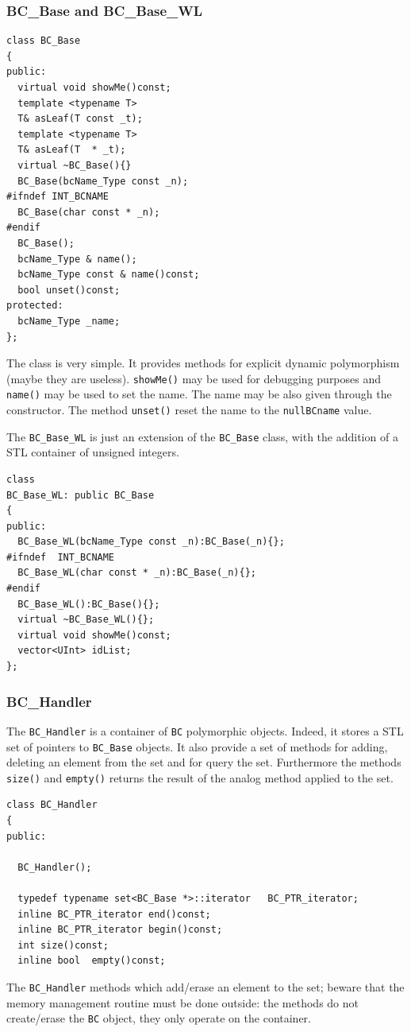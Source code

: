 \subsubsection{BC\_Base and BC\_Base\_WL}
\begin{verbatim}
class BC_Base
{
public:
  virtual void showMe()const;
  template <typename T>
  T& asLeaf(T const _t);
  template <typename T>
  T& asLeaf(T  * _t);
  virtual ~BC_Base(){}
  BC_Base(bcName_Type const _n);
#ifndef INT_BCNAME
  BC_Base(char const * _n);
#endif
  BC_Base();
  bcName_Type & name();
  bcName_Type const & name()const;
  bool unset()const;
protected:
  bcName_Type _name;
};
\end{verbatim}
The class is very simple. It provides methods for explicit dynamic
polymorphism (maybe they are useless). \texttt{showMe()} may be used
for debugging purposes and \texttt{name()} may be used to set the
name. The name may be also given through the constructor. The method
\texttt{unset()} reset the name to the \texttt{nullBCname} value.

The \texttt{BC\_Base\_WL} is just an extension of the
\texttt{BC\_Base} class, with the addition of a STL container of
unsigned integers.
\begin{verbatim}
class
BC_Base_WL: public BC_Base
{
public:
  BC_Base_WL(bcName_Type const _n):BC_Base(_n){};
#ifndef  INT_BCNAME
  BC_Base_WL(char const * _n):BC_Base(_n){};
#endif
  BC_Base_WL():BC_Base(){};
  virtual ~BC_Base_WL(){};
  virtual void showMe()const;
  vector<UInt> idList;
};
\end{verbatim}
\subsubsection{BC\_Handler}
The \texttt{BC\_Handler} is a container of \texttt{BC} polymorphic
objects.  Indeed, it stores a STL set of pointers to \texttt{BC\_Base}
objects. It also provide a set of methods for adding, deleting an
element from the set and for query the set. Furthermore the methods
\texttt{size()} and \texttt{empty()} returns the result of the analog
method applied to the set.

\begin{verbatim}
class BC_Handler
{
public:

  BC_Handler();
  
  typedef typename set<BC_Base *>::iterator   BC_PTR_iterator;
  inline BC_PTR_iterator end()const;
  inline BC_PTR_iterator begin()const;
  int size()const;
  inline bool  empty()const;
\end{verbatim}
The \texttt{BC\_Handler} methods which add/erase an element to the set;
beware that the memory management routine must be done outside: the methods do not
create/erase the \texttt{BC} object, they only operate on the container.

